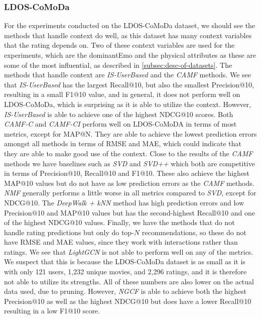 \subsubsection{LDOS-CoMoDa}
For the experiments conducted on the LDOS-CoMoDa dataset, we should see the methods that handle context do well, as this dataset has many context variables that the rating depends on.
Two of these context variables are used for the experiments, which are the dominantEmo and the physical attributes as these are some of the most influential, as described in \autoref{subsec:desc-of-datasets}.
The methods that handle context are \textit{IS-UserBased} and the \textit{CAMF} methods.
We see that \textit{IS-UserBased} has the largest Recall@10, but also the smallest Precision@10, resulting in a small F1@10 value, and in general, it does not perform well on LDOS-CoMoDa, which is surprising as it is able to utilize the context.
However, \textit{IS-UserBased} is able to achieve one of the highest NDCG@10 scores.
Both \textit{CAMF-C} and \textit{CAMF-CI} perform well on LDOS-CoMoDA in terms of most metrics, except for MAP@N.
They are able to achieve the lowest prediction errors amongst all methods in terms of RMSE and MAE, which could indicate that they are able to make good use of the context.
Close to the results of the \textit{CAMF} methods we have baselines such as \textit{SVD} and \textit{SVD++} which both are competitive in terms of Precision@10, Recall@10 and F1@10. 
These also achieve the highest MAP@10 values but do not have as low prediction errors as the \textit{CAMF} methods.
\textit{NMF} generally performs a little worse in all metrics compared to \textit{SVD}, except for NDCG@10.
The \textit{DeepWalk + kNN} method has high prediction errors and low Precision@10 and MAP@10 values but has the second-highest Recall@10 and one of the highest NDCG@10 values.
Finally, we have the methods that do not handle rating predictions but only do top-$N$ recommendations, so these do not have RMSE and MAE values, since they work with interactions rather than ratings.
We see that \textit{LightGCN} is not able to perform well on any of the metrics.
We suspect that this is because the LDOS-CoMoDa dataset is as small as it is with only 121 users, 1,232 unique movies, and 2,296 ratings, and it is therefore not able to utilize its strengths.
All of these numbers are also lower on the actual data used, due to pruning.
However, \textit{NGCF} is able to achieve both the highest Precision@10 as well as the highest NDCG@10 but does have a lower Recall@10 resulting in a low F1@10 score.
\\\\
